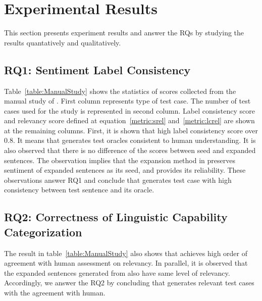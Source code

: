 \section{Experimental Results}
\label{sec:result}

This section presents experiment results and answer the RQs by
studying the results quantatively and qualitatively.


\subsection{RQ1: \tool Sentiment Label Consistency}
Table~\ref{table:ManualStudy} shows the statistics of scores collected
from the manual study of \tool. First column represents type of test
case. The number of test cases used for the study is represented in
second column. Label consistency score and \lc relevancy score defined
at equation~\ref{metric:srel} and~\ref{metric:lcrel} are shown at the
remaining columns. First, it is shown that high label consistency
score over 0.8. It means that \tool generates test oracles consistent
to human understanding. It is also observed that there is no
difference of the scores between seed and expanded sentences. The
observation implies that the expansion method in \tool preserves
sentiment of expanded sentences as its seed, and provides its
reliability. These observations answer RQ1 and conclude that \tool
generates test case with high consistency between test sentence and
its oracle.

\subsection{RQ2: Correctness of Linguistic Capability Categorization}
The result in table~\ref{table:ManualStudy} also shows that \tool
achieves high order of agreement with human assessment on \lc
relevancy. In parallel, it is observed that the expanded sentences
generated from \tool also have same level of \lc
relevancy. Accordingly, we answer the RQ2 by concluding that
\tool generates \lc relevant test cases with the agreement with human.

